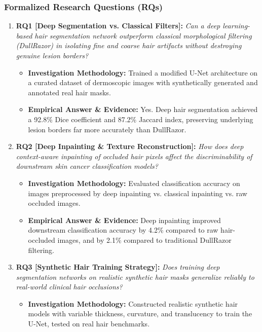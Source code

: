 \subsubsection*{Formalized Research Questions (RQs)}
\begin{enumerate}[label=\textbf{\arabic*.}, leftmargin=*]
  \item \textbf{RQ1 [Deep Segmentation vs. Classical Filters]:} \textit{Can a deep learning-based hair segmentation network outperform classical morphological filtering (DullRazor) in isolating fine and coarse hair artifacts without destroying genuine lesion borders?}
  \begin{itemize}[leftmargin=1.5em]
    \item \textbf{Investigation Methodology:} Trained a modified U-Net architecture on a curated dataset of dermoscopic images with synthetically generated and annotated real hair masks.
    \item \textbf{Empirical Answer \& Evidence:} Yes. Deep hair segmentation achieved a 92.8\% Dice coefficient and 87.2\% Jaccard index, preserving underlying lesion borders far more accurately than DullRazor.
  \end{itemize}
  \item \textbf{RQ2 [Deep Inpainting \& Texture Reconstruction]:} \textit{How does deep context-aware inpainting of occluded hair pixels affect the discriminability of downstream skin cancer classification models?}
  \begin{itemize}[leftmargin=1.5em]
    \item \textbf{Investigation Methodology:} Evaluated classification accuracy on images preprocessed by deep inpainting vs. classical inpainting vs. raw occluded images.
    \item \textbf{Empirical Answer \& Evidence:} Deep inpainting improved downstream classification accuracy by 4.2\% compared to raw hair-occluded images, and by 2.1\% compared to traditional DullRazor filtering.
  \end{itemize}
  \item \textbf{RQ3 [Synthetic Hair Training Strategy]:} \textit{Does training deep segmentation networks on realistic synthetic hair masks generalize reliably to real-world clinical hair occlusions?}
  \begin{itemize}[leftmargin=1.5em]
    \item \textbf{Investigation Methodology:} Constructed realistic synthetic hair models with variable thickness, curvature, and translucency to train the U-Net, tested on real hair benchmarks.

\end{itemize}
\end{enumerate}
